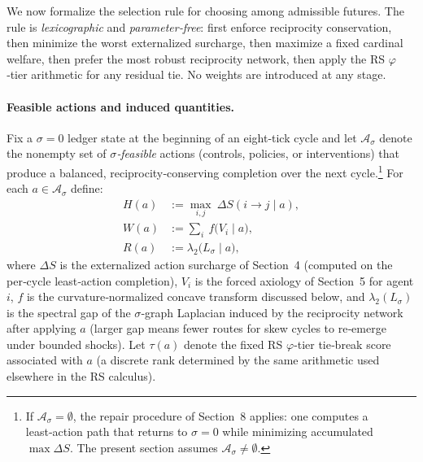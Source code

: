 \documentclass[11pt]{article}
\begin{document}
We now formalize the selection rule for choosing among admissible futures. The rule is \emph{lexicographic} and \emph{parameter‑free}: first enforce reciprocity conservation, then minimize the worst externalized surcharge, then maximize a fixed cardinal welfare, then prefer the most robust reciprocity network, then apply the RS $\varphi$‑tier arithmetic for any residual tie. No weights are introduced at any stage.

\paragraph{Feasible actions and induced quantities.}
Fix a $\sigma\!=\!0$ ledger state at the beginning of an eight‑tick cycle and let $\mathcal{A}_\sigma$ denote the nonempty set of \emph{$\sigma$‑feasible} actions (controls, policies, or interventions) that produce a balanced, reciprocity‑conserving completion over the next cycle.\footnote{If $\mathcal{A}_\sigma=\emptyset$, the repair procedure of Section~8 applies: one computes a least‑action path that returns to $\sigma\!=\!0$ while minimizing accumulated $\max\Delta S$. The present section assumes $\mathcal{A}_\sigma\neq\emptyset$.} For each $a\in\mathcal{A}_\sigma$ define:
\begin{align}
H(a) &:= \max_{i,j}\ \Delta S(i\!\to\! j\mid a),
\label{eq:H-def}
\\[4pt]
W(a) &:= \sum_{i}\ f\!\big(V_i\mid a\big),
\label{eq:W-def}
\\[4pt]
R(a) &:= \lambda_2\!\big(L_\sigma\mid a\big),
\label{eq:R-def}
\end{align}
where $\Delta S$ is the externalized action surcharge of Section~4 (computed on the per‑cycle least‑action completion), $V_i$ is the forced axiology of Section~5 for agent $i$, $f$ is the curvature‑normalized concave transform discussed below, and $\lambda_2(L_\sigma)$ is the spectral gap of the $\sigma$‑graph Laplacian induced by the reciprocity network after applying $a$ (larger gap means fewer routes for skew cycles to re‑emerge under bounded shocks). Let $\tau(a)$ denote the fixed RS $\varphi$‑tier tie‑break score associated with $a$ (a discrete rank determined by the same arithmetic used elsewhere in the RS calculus).
\end{document}
